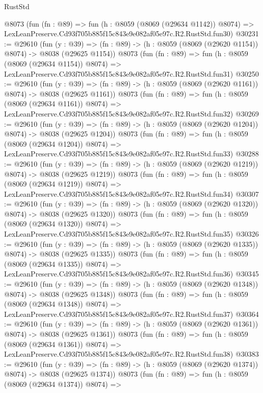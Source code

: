\begin{lexlean}{RustStd}
\begin{coremodule}
    @8073
    (fun (fn : @89) =>
    fun (h : @8059 (@8069 (@29634 @1142)) @8074) =>
    LexLeanPreserve.Cd93f705b885f15c843e9e082af05e97c.R2.RustStd.fun30)
@30231 := @29610
    (fun (y : @39) =>
    (fn : @89) -> (h : @8059 (@8069 (@29620 @1154)) @8074) -> @8038 (@29625 @1154))
    @8073
    (fun (fn : @89) =>
    fun (h : @8059 (@8069 (@29634 @1154)) @8074) =>
    LexLeanPreserve.Cd93f705b885f15c843e9e082af05e97c.R2.RustStd.fun31)
@30250 := @29610
    (fun (y : @39) =>
    (fn : @89) -> (h : @8059 (@8069 (@29620 @1161)) @8074) -> @8038 (@29625 @1161))
    @8073
    (fun (fn : @89) =>
    fun (h : @8059 (@8069 (@29634 @1161)) @8074) =>
    LexLeanPreserve.Cd93f705b885f15c843e9e082af05e97c.R2.RustStd.fun32)
@30269 := @29610
    (fun (y : @39) =>
    (fn : @89) -> (h : @8059 (@8069 (@29620 @1204)) @8074) -> @8038 (@29625 @1204))
    @8073
    (fun (fn : @89) =>
    fun (h : @8059 (@8069 (@29634 @1204)) @8074) =>
    LexLeanPreserve.Cd93f705b885f15c843e9e082af05e97c.R2.RustStd.fun33)
@30288 := @29610
    (fun (y : @39) =>
    (fn : @89) -> (h : @8059 (@8069 (@29620 @1219)) @8074) -> @8038 (@29625 @1219))
    @8073
    (fun (fn : @89) =>
    fun (h : @8059 (@8069 (@29634 @1219)) @8074) =>
    LexLeanPreserve.Cd93f705b885f15c843e9e082af05e97c.R2.RustStd.fun34)
@30307 := @29610
    (fun (y : @39) =>
    (fn : @89) -> (h : @8059 (@8069 (@29620 @1320)) @8074) -> @8038 (@29625 @1320))
    @8073
    (fun (fn : @89) =>
    fun (h : @8059 (@8069 (@29634 @1320)) @8074) =>
    LexLeanPreserve.Cd93f705b885f15c843e9e082af05e97c.R2.RustStd.fun35)
@30326 := @29610
    (fun (y : @39) =>
    (fn : @89) -> (h : @8059 (@8069 (@29620 @1335)) @8074) -> @8038 (@29625 @1335))
    @8073
    (fun (fn : @89) =>
    fun (h : @8059 (@8069 (@29634 @1335)) @8074) =>
    LexLeanPreserve.Cd93f705b885f15c843e9e082af05e97c.R2.RustStd.fun36)
@30345 := @29610
    (fun (y : @39) =>
    (fn : @89) -> (h : @8059 (@8069 (@29620 @1348)) @8074) -> @8038 (@29625 @1348))
    @8073
    (fun (fn : @89) =>
    fun (h : @8059 (@8069 (@29634 @1348)) @8074) =>
    LexLeanPreserve.Cd93f705b885f15c843e9e082af05e97c.R2.RustStd.fun37)
@30364 := @29610
    (fun (y : @39) =>
    (fn : @89) -> (h : @8059 (@8069 (@29620 @1361)) @8074) -> @8038 (@29625 @1361))
    @8073
    (fun (fn : @89) =>
    fun (h : @8059 (@8069 (@29634 @1361)) @8074) =>
    LexLeanPreserve.Cd93f705b885f15c843e9e082af05e97c.R2.RustStd.fun38)
@30383 := @29610
    (fun (y : @39) =>
    (fn : @89) -> (h : @8059 (@8069 (@29620 @1374)) @8074) -> @8038 (@29625 @1374))
    @8073
    (fun (fn : @89) =>
    fun (h : @8059 (@8069 (@29634 @1374)) @8074) =>

\end{coremodule}
\end{lexlean}
